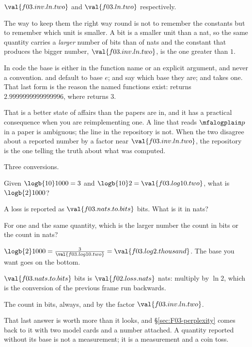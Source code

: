 \begin{fr}
\begin{ansblock}
$\val{f03.inv.ln.two}$ and $\val{f03.ln.two}$ respectively.

The way to keep them the right way round is not to remember the constants but
to remember which unit is smaller. A bit is a smaller unit than a nat, so the
same quantity carries a \emph{larger} number of bits than of nats \dash{} and
the constant that produces the bigger number, $\val{f03.inv.ln.two}$, is the
one greater than $1$.
\end{ansblock}

\begin{aibox}
In code the base is either in the function name or an explicit argument, and
never a convention.  and  default to base $e$;
 and  say which base they are; and
 takes one. That last form is the reason the named
functions exist:  returns
$\num{2.9999999999999996}$, where  returns $3$.

That is a better state of affairs than the papers are in, and it has a
practical consequence when you are reimplementing one. A line that reads
$\mfalogplain p$ in a paper is ambiguous; the line  in the
repository is not. When the two disagree about a reported number by a factor
near $\val{f03.inv.ln.two}$, the repository is the one telling the truth about
what was computed.
\end{aibox}

\yourturn
Three conversions.

Given $\logb{10} 1000 = 3$ and $\logb{10} 2 = \val{f03.log10.two}$, what is
$\logb{2} 1000$?

A loss is reported as $\val{f03.nats.to.bits}$ bits. What is it in nats?

For one and the same quantity, which is the larger number \dash{} the count in
bits or the count in nats?
\dotline
\nextframe
\end{fr}

\begin{fr}
\begin{ansblock}
$\logb{2} 1000 = \frac{3}{\val{f03.log10.two}} = \val{f03.log2.thousand}$. The
base you want goes on the bottom.

$\val{f03.nats.to.bits}$ bits is $\val{f02.loss.nats}$ nats: multiply by
$\ln 2$, which is the conversion of the previous frame run backwards.

The count in bits, always, and by the factor $\val{f03.inv.ln.two}$.
\end{ansblock}

That last answer is worth more than it looks, and \S\ref{sec:F03-perplexity}
comes back to it with two model cards and a number attached. A quantity
reported without its base is not a measurement; it is a measurement and a
coin toss.
\end{fr}

